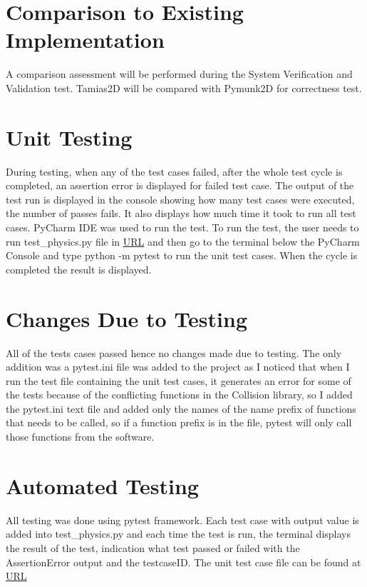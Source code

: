 \documentclass[12pt, titlepage]{article}
\begin{document}
\section{Comparison to Existing Implementation}	
A comparison assessment will be performed during the System Verification and Validation test. Tamias2D will be compared with Pymunk2D for correctness test.


\section{Unit Testing}
During testing, when any of the test cases failed, after the whole test cycle is completed, an assertion error is displayed for failed test case. The output of the test run is displayed in the console showing how many test cases were executed, the number of passes fails. It also displays how much time it took to run all test cases. PyCharm IDE was used to run the test. To run the test, the user needs to run test\_physics.py file in \url{URL} and then go to the terminal below the PyCharm Console and type python -m pytest to run the unit test cases. When the cycle is completed the result is displayed.

\section{Changes Due to Testing}
All of the tests cases passed hence no changes made due to testing. The only addition was a pytest.ini file was added to the project as I noticed that when I run the test file containing the unit test cases, it generates an error for some of the tests because of the conflicting functions in the Collision library, so I added the pytest.ini text file and added only the names of the name prefix of functions that needs to be called, so if a function prefix is in the file, pytest will only call those functions from the software.
\section{Automated Testing}

All testing was done using pytest framework. Each test case with output value is added into test\_physics.py and each time the test is run, the terminal displays the result of the test, indication what test passed or failed with the AssertionError output and the testcaseID. The unit test case file can be found at \url{URL}
	
\end{document}
